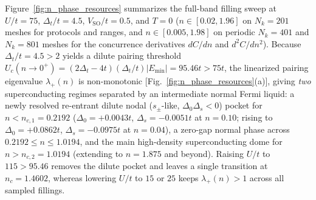 \documentclass[aps,prb,twocolumn,superscriptaddress,longbibliography]{revtex4-2}
\begin{document}
Figure~\ref{fig:n_phase_resources} summarizes the full-band filling
sweep at $U/t=75$, $\Delta_t/t=4.5$, $V_{\mathrm{SO}}/t=0.5$, and $T=0$
($n\in[0.02,1.96]$ on $N_k=201$ meshes for protocols and ranges, and
$n\in[0.005,1.98]$ on periodic $N_k=401$ and $N_k=801$ meshes for the
concurrence derivatives $dC/dn$ and $d^2C/dn^2$).
Because $\Delta_t/t=4.5>2$ yields a dilute pairing threshold
$U_c(n\to 0^+)=(2\Delta_t-4t)(\Delta_t/t)|E_{\min}|=95.46t>75t$, the
linearized pairing eigenvalue $\lambda_+(n)$ is non-monotonic
[Fig.~\ref{fig:n_phase_resources}(a)], giving \emph{two} superconducting
regimes separated by an intermediate normal Fermi liquid: a newly
resolved re-entrant dilute nodal ($s_{\pm}$-like, $\Delta_0\Delta_s<0$)
pocket for $n<n_{c,1}=0.2192$ ($\Delta_0=+0.0043t$, $\Delta_s=-0.0051t$ at
$n=0.10$; rising to $\Delta_0=+0.0862t$, $\Delta_s=-0.0975t$ at $n=0.04$),
a zero-gap normal phase across $0.2192\le n\le 1.0194$, and the main
high-density superconducting dome for $n>n_{c,2}=1.0194$ (extending to
$n=1.875$ and beyond). Raising $U/t$ to $115>95.46$ removes the dilute
pocket and leaves a single transition at $n_c=1.4602$, whereas lowering
$U/t$ to $15$ or $25$ keeps $\lambda_+(n)>1$ across all sampled fillings.
\end{document}
